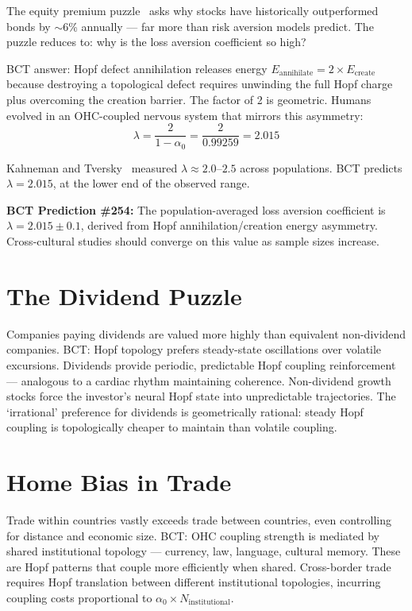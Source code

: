 \documentclass[aps,prl,twocolumn,superscriptaddress]{revtex4-2}
\begin{document}
The equity premium puzzle~\cite{Mehra1985} asks why stocks have historically outperformed bonds by $\sim$6\% annually --- far more than risk aversion models predict. The puzzle reduces to: why is the loss aversion coefficient so high?

BCT answer: Hopf defect annihilation releases energy $E_{\mathrm{annihilate}} = 2 \times E_{\mathrm{create}}$ because destroying a topological defect requires unwinding the full Hopf charge plus overcoming the creation barrier. The factor of 2 is geometric. Humans evolved in an OHC-coupled nervous system that mirrors this asymmetry:
\begin{equation}
\lambda = \frac{2}{1 - \alpha_0} = \frac{2}{0.99259} = 2.015
\end{equation}

Kahneman and Tversky~\cite{Kahneman1979} measured $\lambda \approx 2.0$--$2.5$ across populations. BCT predicts $\lambda = 2.015$, at the lower end of the observed range.

\textbf{BCT Prediction \#254:} The population-averaged loss aversion coefficient is $\lambda = 2.015 \pm 0.1$, derived from Hopf annihilation/creation energy asymmetry. Cross-cultural studies should converge on this value as sample sizes increase.

\section{The Dividend Puzzle}

Companies paying dividends are valued more highly than equivalent non-dividend companies. BCT: Hopf topology prefers steady-state oscillations over volatile excursions. Dividends provide periodic, predictable Hopf coupling reinforcement --- analogous to a cardiac rhythm maintaining coherence. Non-dividend growth stocks force the investor's neural Hopf state into unpredictable trajectories. The `irrational' preference for dividends is geometrically rational: steady Hopf coupling is topologically cheaper to maintain than volatile coupling.

\section{Home Bias in Trade}

Trade within countries vastly exceeds trade between countries, even controlling for distance and economic size. BCT: OHC coupling strength is mediated by shared institutional topology --- currency, law, language, cultural memory. These are Hopf patterns that couple more efficiently when shared. Cross-border trade requires Hopf translation between different institutional topologies, incurring coupling costs proportional to $\alpha_0 \times N_{\mathrm{institutional}}$.
\end{document}
